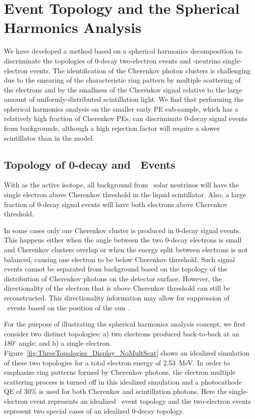 \section{Event Topology and the Spherical Harmonics Analysis}
\label{sec:topology_and_harmonics}

We have developed a method based on a spherical harmonics
decomposition to discriminate the topologies of 0\nbb-decay
two-electron events and \B-neutrino single-electron events. The
identification of the Cherenkov photon clusters is challenging due to
the smearing of the characteristic ring pattern by multiple scattering
of the electrons and by the smallness of the Cherenkov signal
relative to the large amount of uniformly-distributed scintillation
light.  We find that performing the spherical harmonics analysis on
the smaller early PE sub-sample, which has a relatively high fraction
of Cherenkov PEs, can discriminate 0\nbb-decay signal events from
backgrounds, although a high rejection factor will require a slower
scintillator than in the model.

\subsection{Topology of 0\nbb-decay and \B~Events}
\label{subsec:topology}

With \Te as the active isotope, all background from \B~solar neutrinos
will have the single electron above Cherenkov threshold in the liquid
scintillator. Also, a large fraction of 0\nbb-decay signal events will
have both electrons above Cherenkov threshold.

In some cases only one Cherenkov cluster is produced in 0\nbb-decay
signal events. This happens either when the angle between the two
0\nbb-decay electrons is small and Cherenkov clusters overlap or when
the energy split between electrons is not balanced, causing one
electron to be below Cherenkov threshold.  Such signal events cannot
be separated from background based on the topology of the distribution
of Cherenkov photons on the detector surface.  However, the
directionality of the electron that is above Cherenkov threshold can
still be reconstructed. This directionality information may allow for
suppression of \B~events based on the position of the
sun~\cite{sun_direction_cut}.

For the purpose of illustrating the spherical harmonics analysis
concept, we first consider two distinct topologies: a) two electrons
produced back-to-back at an 180$^{\circ}$ angle;  and b) a single electron.
Figure~\ref{fig:ThreeTopologies_Display_NoMultScat} shows an idealized
simulation of these two topologies for a total electron energy of
2.53~MeV. In order to emphasize ring patterns formed by Cherenkov
photons, the electron multiple scattering process is turned off in this
idealized simulation and a photocathode QE of 30\% is used for both
Cherenkov and scintillation photons. Here the single-electron event
represents an idealized \B~event topology and the two-electron events
represent two special cases of an idealized 0\nbb-decay topology.



